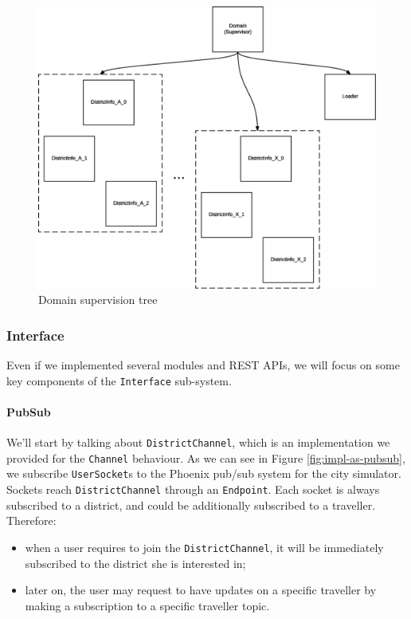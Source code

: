 \begin{figure}[H]
  \centering
  \includegraphics[width=\columnwidth]{images/implementation/as-domain.eps}
  \caption{Domain supervision tree}
  \label{fig:impl-as-domain}
\end{figure}

\subsubsection{Interface}

Even if we implemented several modules and REST APIs, we will focus on some
key components of the \texttt{Interface} sub-system.

\paragraph{PubSub}
We'll start by talking about \texttt{DistrictChannel}, which is an
implementation we provided for the \texttt{Channel} behaviour. As we can see
in Figure \ref{fig:impl-as-pubsub}, we subscribe \texttt{UserSocket}s to the
Phoenix pub/sub system for the city simulator.
Sockets reach \texttt{DistrictChannel} through an \texttt{Endpoint}.
Each socket is always subscribed to a district, and could be additionally
subscribed to a traveller. Therefore:

\begin{itemize}
  \item when a user requires to join the \texttt{DistrictChannel}, it will
    be immediately subscribed to the district she is interested in;
  \item later on, the user may request to have updates on a specific traveller
    by making a subscription to a specific traveller topic.
\end{itemize}

